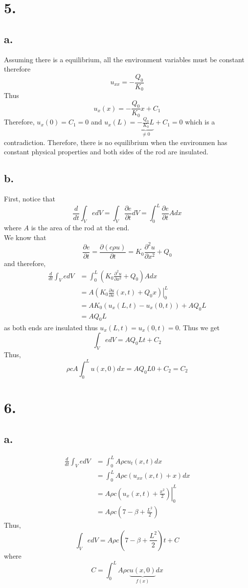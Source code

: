 \documentclass[11pt]{article}
\theoremstyle{mystyle}
\theoremstyle{definition}
\begin{document}
\section*{5.}
\subsection*{a.}
Assuming there is a equilibrium, all the environment variables must be constant therefore 
\[
  u_{xx} = -\frac{Q_0}{K_0}
\]
Thus 
\[
  u_x(x) = -\frac{Q_0}{K_0}x + C_1
\]
Therefore, $u_x(0) = C_1 = 0$ and $u_x(L) = \underbrace{-\frac{Q_0}{K_0}L}_{\ne 0} + C_1 = 0$ which is a contradiction. Therefore, there is no equilibrium when the environmen has constant physical properties and both sides of the rod are insulated. 
\subsection*{b.}
First, notice that 
\[
  \frac{d}{dt} \int_V e dV = \int_V \displaystyle\frac{\partial e}{\partial t} dV = \int_0^L \displaystyle\frac{\partial e}{\partial t} A dx
\]
where $A$ is the area of the rod at the end. \\
We know that 
\[
  \displaystyle\frac{\partial e}{\partial t} = \displaystyle\frac{\partial (c\rho u)}{\partial t} = K_0 \displaystyle\frac{\partial^2 u}{\partial x^2} + Q_0
\]
and therefore, 
\begin{align*}
  \displaystyle\frac{d}{dt} \int_V edV 
  &= \int_0^L \left(K_0 \displaystyle\frac{\partial^2 u }{\partial x^2} + Q_0 \right) A dx \\
  &= A \left. \left(K_0 \displaystyle\frac{\partial u}{\partial x}(x,t) + Q_0x \right) \right|_0^L\\
  &= AK_0 \left(u_x(L, t) - u_x(0, t) \right) + AQ_0L \\
  &= AQ_0 L
\end{align*}
as both ends are insulated thus $u_x(L, t) = u_x(0,t) = 0$.
Thus we get
\[
  \int_V edV = AQ_0L t + C_2
\]
Thus, 
\[
  \rho c A \int_0^L u(x,0) dx = AQ_0L0 + C_2 = C_2
\]
\newpage
\section*{6.}
\subsection*{a.}
\begin{align*}
  \displaystyle\frac{d}{dt}\int_V e dV 
  &= \int_0^L A \rho c u_t(x,t) dx \\
  &= \int_0^L A \rho c (u_{xx}(x,t) + x ) dx\\
  &= A \rho c \left. \left( u_x(x,t) + \displaystyle\frac{x^2}{2} \right) \right|_0^L \\
  &= A \rho c \left(7 - \beta + \displaystyle\frac{L^2}{2}\right) 
\end{align*}
Thus, 
\[
  \int_V edV = A\rho c \left(7 - \beta + \displaystyle\frac{L^2}{2} \right) t + C
\]
where 
\[
  C = \int_0^L A\rho c \underbrace{u(x,0)}_{f(x)} dx
\]
\end{document}
